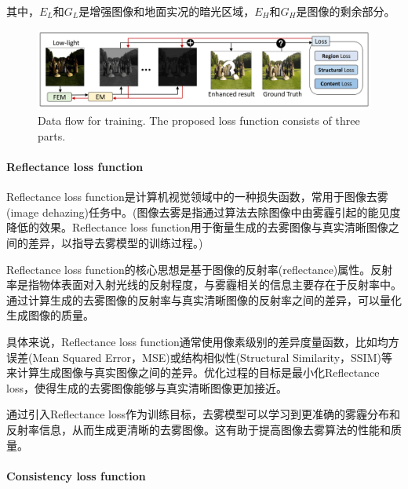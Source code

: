\documentclass[letterpaper,12pt]{article}
\begin{document}
	其中，$E_L$和$G_L$是增强图像和地面实况的暗光区域，$E_H$和$G_H$是图像的剩余部分。	
	\begin{figure}[htbp] 
		\centering 
		\includegraphics[width=0.8\columnwidth]{proposed_loss_function}
		\captionsetup{font=scriptsize}
		\caption{
			\label{fig: proposed_loss_function} %
			Data flow for training. The proposed loss function consists of three parts.
		}
	\end{figure}
	
	\paragraph{Reflectance loss function}
	
	Reflectance loss function是计算机视觉领域中的一种损失函数，常用于图像去雾(image dehazing)任务中。(图像去雾是指通过算法去除图像中由雾霾引起的能见度降低的效果。Reflectance loss function用于衡量生成的去雾图像与真实清晰图像之间的差异，以指导去雾模型的训练过程。)
	
	Reflectance loss function的核心思想是基于图像的反射率(reflectance)属性。反射率是指物体表面对入射光线的反射程度，与雾霾相关的信息主要存在于反射率中。通过计算生成的去雾图像的反射率与真实清晰图像的反射率之间的差异，可以量化生成图像的质量。
	
	具体来说，Reflectance loss function通常使用像素级别的差异度量函数，比如均方误差(Mean Squared Error，MSE)或结构相似性(Structural Similarity，SSIM)等来计算生成图像与真实图像之间的差异。优化过程的目标是最小化Reflectance loss，使得生成的去雾图像能够与真实清晰图像更加接近。
	
	通过引入Reflectance loss作为训练目标，去雾模型可以学习到更准确的雾霾分布和反射率信息，从而生成更清晰的去雾图像。这有助于提高图像去雾算法的性能和质量。
	
	\paragraph{Consistency loss function}
	
\end{document}
